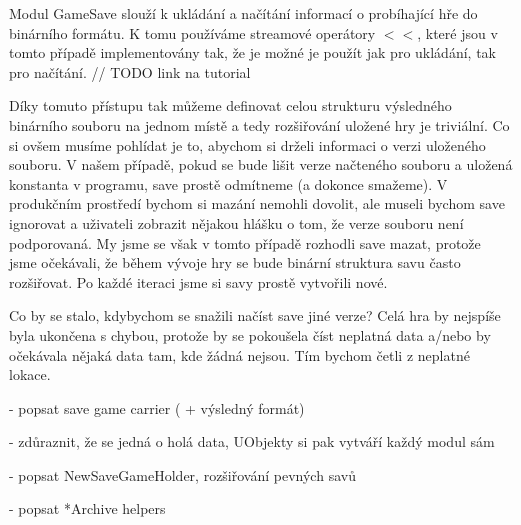 
Modul GameSave slouží  k ukládání a načítání informací o probíhající hře do binárního formátu. K tomu používáme streamové operátory $<<$, které jsou v tomto případě implementovány tak, že je možné je použít jak pro ukládání, tak pro načítání. // TODO link na tutorial

Díky tomuto přístupu tak můžeme definovat celou strukturu výsledného binárního souboru na jednom místě a tedy rozšiřování uložené hry je triviální. Co si ovšem musíme pohlídat je to, abychom si drželi informaci o verzi uloženého souboru. V našem případě, pokud se bude lišit verze načteného souboru a uložená konstanta v programu, save prostě odmítneme (a dokonce smažeme). V produkčním prostředí bychom si mazání nemohli dovolit, ale museli bychom save ignorovat a uživateli zobrazit nějakou hlášku o tom, že verze souboru není podporovaná. My jsme se však v tomto případě rozhodli save mazat, protože jsme očekávali, že během vývoje hry se bude binární struktura savu často rozšiřovat. Po každé iteraci jsme si savy prostě vytvořili nové.

Co by se stalo, kdybychom se snažili načíst save jiné verze? Celá hra by nejspíše byla ukončena s chybou, protože by se pokoušela číst neplatná data a/nebo by očekávala nějaká data tam, kde žádná nejsou. Tím bychom četli z neplatné lokace.


- popsat save game carrier ( + výsledný formát)

- zdůraznit, že se jedná o holá data, UObjekty si pak vytváří každý modul sám

- popsat NewSaveGameHolder, rozšiřování pevných savů 

- popsat *Archive helpers 